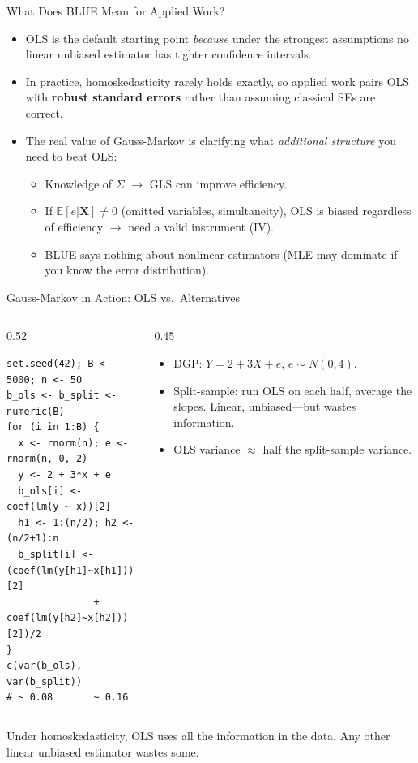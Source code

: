 \documentclass[aspectratio=169, handout]{beamer}
\numberwithin{equation}{section}
\begin{document}
\begin{frame}{What Does BLUE Mean for Applied Work?}
\begin{itemize}
\item OLS is the default starting point \emph{because} under the strongest assumptions no linear unbiased estimator has tighter confidence intervals.\pause
\item In practice, homoskedasticity rarely holds exactly, so applied work pairs OLS with \textbf{robust standard errors} rather than assuming classical SEs are correct.\pause
\item The real value of Gauss-Markov is clarifying what \emph{additional structure} you need to beat OLS:
\begin{itemize}
\item Knowledge of $\Sigma$ $\to$ GLS can improve efficiency.
\item If $\mathbb{E}[e|\bm{X}]\neq 0$ (omitted variables, simultaneity), OLS is biased regardless of efficiency $\to$ need a valid instrument (IV).
\item BLUE says nothing about nonlinear estimators (MLE may dominate if you know the error distribution).
\end{itemize}
\end{itemize}
\end{frame}

\begin{frame}[fragile]{Gauss-Markov in Action: OLS vs.\ Alternatives}
\begin{columns}[T]
\begin{column}{0.52\textwidth}
\begin{lstlisting}[basicstyle=\ttfamily\scriptsize, numbers=none]
set.seed(42); B <- 5000; n <- 50
b_ols <- b_split <- numeric(B)
for (i in 1:B) {
  x <- rnorm(n); e <- rnorm(n, 0, 2)
  y <- 2 + 3*x + e
  b_ols[i] <- coef(lm(y ~ x))[2]
  h1 <- 1:(n/2); h2 <- (n/2+1):n
  b_split[i] <- (coef(lm(y[h1]~x[h1]))[2]
               + coef(lm(y[h2]~x[h2]))[2])/2
}
c(var(b_ols), var(b_split))
# ~ 0.08       ~ 0.16
\end{lstlisting}
\end{column}
\begin{column}{0.45\textwidth}
\begin{itemize}\setlength{\itemsep}{2pt}
\item DGP: $Y=2+3X+e$, $e\sim N(0,4)$.
\item Split-sample: run OLS on each half, average the slopes. Linear, unbiased---but wastes information.
\item OLS variance $\approx$ half the split-sample variance.
\end{itemize}
\end{column}
\end{columns}
\smallskip
\begin{tcolorbox}[colback=blue!5, colframe=blue!50, boxsep=2pt, top=2pt, bottom=2pt]
Under homoskedasticity, OLS uses all the information in the data. Any other linear unbiased estimator wastes some.
\end{tcolorbox}
\end{frame}
\end{document}
